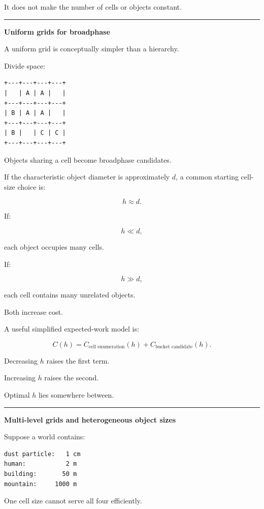 It does not make the number of cells or objects constant.

\begin{center}\rule{0.5\linewidth}{0.5pt}\end{center}

\textbf{Uniform grids for broadphase}

A uniform grid is conceptually simpler than a hierarchy.

Divide space:

\begin{verbatim}
+---+---+---+---+
|   | A | A |   |
+---+---+---+---+
| B | A | A |   |
+---+---+---+---+
| B |   | C | C |
+---+---+---+---+
\end{verbatim}

Objects sharing a cell become broadphase candidates.

If the characteristic object diameter is approximately \(d\), a common starting cell-size choice is:

\[
h\approx d.
\]

If:

\[
h\ll d,
\]

each object occupies many cells.

If:

\[
h\gg d,
\]

each cell contains many unrelated objects.

Both increase cost.

A useful simplified expected-work model is:

\[
C(h)
=
C_{\text{cell enumeration}}(h)
+
C_{\text{bucket candidate}}(h).
\]

Decreasing \(h\) raises the first term.

Increasing \(h\) raises the second.

Optimal \(h\) lies somewhere between.

\begin{center}\rule{0.5\linewidth}{0.5pt}\end{center}

\textbf{Multi-level grids and heterogeneous object sizes}

Suppose a world contains:

\begin{verbatim}
dust particle:   1 cm
human:           2 m
building:       50 m
mountain:     1000 m
\end{verbatim}

One cell size cannot serve all four efficiently.

